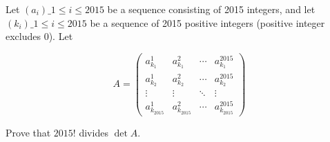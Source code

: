 Let $(a_i)\_{1 \le i \le 2015}$ be a sequence consisting of 2015 integers, and
let $(k_i)\_{1 \le i \le 2015}$ be a sequence of 2015 positive integers
(positive integer excludes 0). Let

$$
A = \begin{pmatrix}
      a_{k_1}^1      & a_{k_1}^2      & \cdots & a_{k_1}^{2015} \\
      a_{k_2}^1      & a_{k_2}^2      & \cdots & a_{k_2}^{2015} \\
      \vdots         & \vdots         & \ddots & \vdots         \\
      a_{k_{2015}}^1 & a_{k_{2015}}^2 & \cdots & a_{k_{2015}}^{2015}
    \end{pmatrix}
$$

Prove that $2015!$ divides $\det A$.
